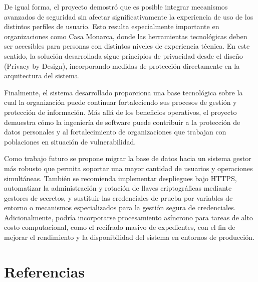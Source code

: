 \documentclass[10pt, letterpaper]{article}
\begin{document}
De igual forma, el proyecto demostró que es posible integrar mecanismos avanzados de seguridad sin afectar significativamente la experiencia de uso de los distintos perfiles de usuario. Esto resulta especialmente importante en organizaciones como Casa Monarca, donde las herramientas tecnológicas deben ser accesibles para personas con distintos niveles de experiencia técnica. En este sentido, la solución desarrollada sigue principios de privacidad desde el diseño (Privacy by Design), incorporando medidas de protección directamente en la arquitectura del sistema.

Finalmente, el sistema desarrollado proporciona una base tecnológica sobre la cual la organización puede continuar fortaleciendo sus procesos de gestión y protección de información. Más allá de los beneficios operativos, el proyecto demuestra cómo la ingeniería de software puede contribuir a la protección de datos personales y al fortalecimiento de organizaciones que trabajan con poblaciones en situación de vulnerabilidad.

Como trabajo futuro se propone migrar la base de datos hacia un sistema gestor más robusto que permita soportar una mayor cantidad de usuarios y operaciones simultáneas. También se recomienda implementar despliegues bajo HTTPS, automatizar la administración y rotación de llaves criptográficas mediante gestores de secretos, y sustituir las credenciales de prueba por variables de entorno o mecanismos especializados para la gestión segura de credenciales. Adicionalmente, podría incorporarse procesamiento asíncrono para tareas de alto costo computacional, como el recifrado masivo de expedientes, con el fin de mejorar el rendimiento y la disponibilidad del sistema en entornos de producción.


\newpage

\section{Referencias}
\end{document}
